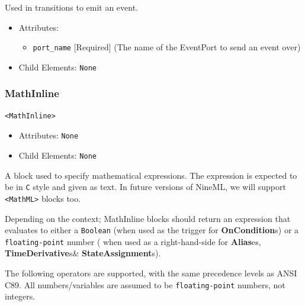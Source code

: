 \documentclass{article}
\newcommand{\StateAssignments}{{\bf{StateAssignment}}s\xspace}
\newcommand{\TimeDerivatives}{{\bf{TimeDerivative}}s\xspace}
\newcommand{\Aliases}{{\bf{Alias}}es\xspace}
\newcommand{\OnConditions}{{\bf{OnCondition}}s\xspace}
\begin{document}
Used in transitions to emit an event.

\begin{itemize}
\item Attributes:
%
\begin{itemize}
\item \verb|port_name| {[}Required{]} (The name of the EventPort to send an event over)
\end{itemize}

\item Child Elements: \texttt{None}
\end{itemize}

\subsubsection{MathInline}
%
\begin{lstlisting}
<MathInline>
\end{lstlisting}
\begin{itemize}
\item Attributes:  \texttt{None}

\item Child Elements: \texttt{None}
\end{itemize}

A block used to specify mathematical expressions. The expression is expected to
be in \texttt{C} style and given as text. In future versions of NineML, we will
support \verb|<MathML>| blocks too.

Depending on the context; MathInline blocks should return an expression that
evaluates to either a \verb|Boolean| (when used as the trigger for \OnConditions) or a \verb|floating-point| number ( when used  as a right-hand-side for  \Aliases, \TimeDerivatives \& \StateAssignments).

The following operators are supported, with the same precedence levels as ANSI C89. All
numbers/variables are assumed to be \verb|floating-point| numbers, not integers.
\end{document}
